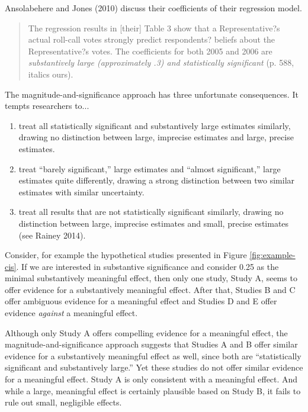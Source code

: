 \documentclass[12pt]{article}
\begin{document}
Ansolabehere and Jones (2010) discuss their coefficients of their regression model.

\begin{quote}
The regression results in [their] Table 3 show that a Representative?s actual roll-call votes strongly predict respondents? beliefs about the Representative?s votes. The coefficients for both 2005 and 2006 are \emph{substantively large (approximately .3) and statistically significant} (p. 588, italics ours). 
\end{quote}

The magnitude-and-significance approach has three unfortunate consequences. It tempts researchers to...

\begin{enumerate}
\item treat all statistically significant and substantively large estimates similarly, drawing no distinction between large, imprecise estimates and large, precise estimates.
\item treat ``barely significant,'' large estimates and ``almost significant,'' large estimates quite differently, drawing a strong distinction between two similar estimates with similar uncertainty.
\item treat all results that are not statistically significant similarly, drawing no distinction between large, imprecise estimates and small, precise estimates (see Rainey 2014).
\end{enumerate}

Consider, for example the hypothetical studies presented in Figure \ref{fig:example-cis}. If we are interested in substantive significance and consider 0.25 as the minimal substantively meaningful effect, then only one study, Study A, seems to offer evidence for a substantively meaningful effect. After that, Studies B and C offer ambiguous evidence for a meaningful effect and Studies D and E offer evidence \emph{against} a meaningful effect.

Although only Study A offers compelling evidence for a meaningful effect, the magnitude-and-significance approach suggests that Studies A and B offer similar evidence for a substantively meaningful effect as well, since both are ``statistically significant and substantively large.''  Yet these studies do not offer similar evidence for a meaningful effect. Study A is only consistent with a meaningful effect. And while a large, meaningful effect is certainly plausible based on Study B, it fails to rule out small, negligible effects.
\end{document}
